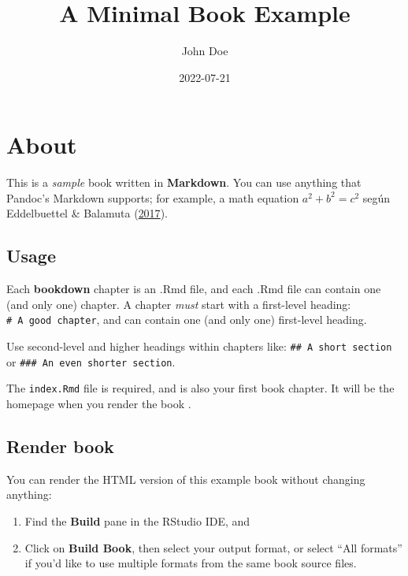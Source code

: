\documentclass[
  12pt,
]{book}
\title{A Minimal Book Example}
\author{John Doe}
\date{2022-07-21}
\theoremstyle{definition}
\theoremstyle{definition}
\theoremstyle{definition}
\theoremstyle{definition}
\theoremstyle{remark}
\begin{document}
\maketitle

{
\setcounter{tocdepth}{1}
\tableofcontents
}
\listoffigures
\listoftables
\mainmatter

\hypertarget{about}{%
\chapter{About}\label{about}}

This is a \emph{sample} book written in \textbf{Markdown}. You can use anything that Pandoc's Markdown supports; for example, a math equation \(a^2 + b^2 = c^2\) según Eddelbuettel \& Balamuta (\protect\hyperlink{ref-eddelbuettel2017ExtendingBrief}{2017}).

\hypertarget{usage}{%
\section{Usage}\label{usage}}

Each \textbf{bookdown} chapter is an .Rmd file, and each .Rmd file can contain one (and only one) chapter. A chapter \emph{must} start with a first-level heading: \texttt{\#\ A\ good\ chapter}, and can contain one (and only one) first-level heading.

Use second-level and higher headings within chapters like: \texttt{\#\#\ A\ short\ section} or \texttt{\#\#\#\ An\ even\ shorter\ section}.

The \texttt{index.Rmd} file is required, and is also your first book chapter. It will be the homepage when you render the book .

\hypertarget{render-book}{%
\section{Render book}\label{render-book}}

You can render the HTML version of this example book without changing anything:

\begin{enumerate}
\def\labelenumi{\arabic{enumi}.}
\item
  Find the \textbf{Build} pane in the RStudio IDE, and
\item
  Click on \textbf{Build Book}, then select your output format, or select ``All formats'' if you'd like to use multiple formats from the same book source files.
\end{enumerate}
\end{document}
